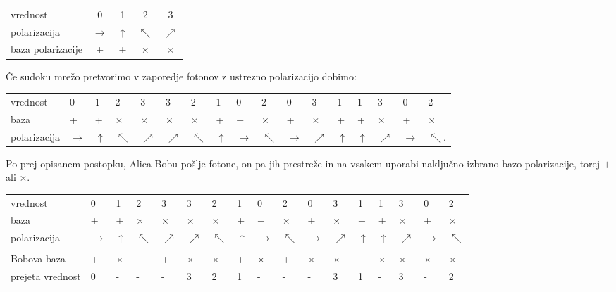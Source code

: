 \documentclass[A4paper, 11pt]{article}
\begin{document}
\begin{center}
\begin{tabular}{l c c c c}
vrednost & 0 & 1 & 2 & 3\\
polarizacija & $\rightarrow$ & $\uparrow$ & $\nwarrow$ & $\nearrow$\\
baza polarizacije & + & + & $\times$ & $\times$\\
\end{tabular}
\end{center}

\pagebreak

Če sudoku mrežo pretvorimo v zaporedje fotonov z ustrezno polarizacijo dobimo:

\begin{center}
\begin{tabular}{l m{0.2 cm} m{0.2 cm} m{0.2 cm} m{0.2 cm} m{0.2 cm} m{0.2 cm} m{0.2 cm} m{0.2 cm} m{0.2 cm} m{0.2 cm} m{0.2 cm} m{0.2 cm} m{0.2 cm} m{0.2 cm} m{0.2 cm} m{0.2 cm}}
vrednost & 0 & 1 & 2 & 3 & 3 & 2 & 1 & 0 & 2 & 0 & 3 & 1 & 1 & 3 & 0 & 2\\
baza & + & + & $\times$ & $\times$ & $\times$ & $\times$ & + & + & $\times$ & + & $\times$ & + & + & $\times$ & + & $\times$\\
polarizacija & $\rightarrow$ & $\uparrow$ & $\nwarrow$ & $\nearrow$ & $\nearrow$ & $\nwarrow$ & $\uparrow$ & $\rightarrow$ & $\nwarrow$ & $\rightarrow$ & $\nearrow$ & $\uparrow$ & $\uparrow$ & $\nearrow$ & $\rightarrow$ & $\nwarrow$.
\end{tabular}
\end{center}

Po prej opisanem postopku, Alica Bobu pošlje fotone, on pa jih prestreže in na vsakem uporabi naključno izbrano bazo polarizacije, torej $+$ ali $\times$. 

\begin{center}
\begin{tabular}{l m{0.2 cm} m{0.2 cm} m{0.2 cm} m{0.2 cm} m{0.2 cm} m{0.2 cm} m{0.2 cm} m{0.2 cm} m{0.2 cm} m{0.2 cm} m{0.2 cm} m{0.2 cm} m{0.2 cm} m{0.2 cm} m{0.2 cm} m{0.2 cm}}
vrednost & 0 & 1 & 2 & 3 & 3 & 2 & 1 & 0 & 2 & 0 & 3 & 1 & 1 & 3 & 0 & 2\\
baza & + & + & $\times$ & $\times$ & $\times$ & $\times$ & + & + & $\times$ & + & $\times$ & + & + & $\times$ & + & $\times$\\
polarizacija & $\rightarrow$ & $\uparrow$ & $\nwarrow$ & $\nearrow$ & $\nearrow$ & $\nwarrow$ & $\uparrow$ & $\rightarrow$ & $\nwarrow$ & $\rightarrow$ & $\nearrow$ & $\uparrow$ & $\uparrow$ & $\nearrow$ & $\rightarrow$ & $\nwarrow$\\
\\
Bobova baza & + & $\times$ & + & + & $\times$ & $\times$ & + & $\times$ & + & $\times$ & $\times$ & + & $\times$ & $\times$ & $\times$ & $\times$\\
prejeta vrednost & 0 & - & - & - & 3 & 2 & 1 & - & - & - & 3 & 1 & - & 3 & - & 2\\ 
\end{tabular}
\end{center}
\end{document}
